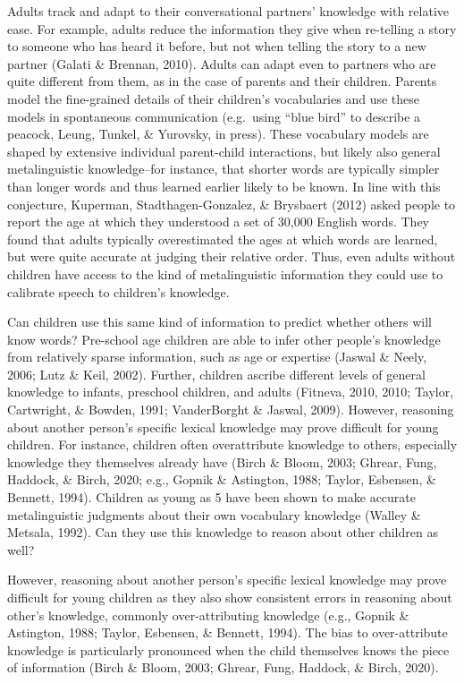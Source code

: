 \documentclass[10pt, letterpaper]{article}
\begin{document}
Adults track and adapt to their conversational partners' knowledge with
relative ease. For example, adults reduce the information they give when
re-telling a story to someone who has heard it before, but not when
telling the story to a new partner (Galati \& Brennan, 2010). Adults can
adapt even to partners who are quite different from them, as in the case
of parents and their children. Parents model the fine-grained details of
their children's vocabularies and use these models in spontaneous
communication (e.g.~using {``blue bird''} to describe a peacock, Leung,
Tunkel, \& Yurovsky, in press). These vocabulary models are shaped by
extensive individual parent-child interactions, but likely also general
metalinguistic knowledge--for instance, that shorter words are typically
simpler than longer words and thus learned earlier likely to be known.
In line with this conjecture, Kuperman, Stadthagen-Gonzalez, \&
Brysbaert (2012) asked people to report the age at which they understood
a set of 30,000 English words. They found that adults typically
overestimated the ages at which words are learned, but were quite
accurate at judging their relative order. Thus, even adults without
children have access to the kind of metalinguistic information they
could use to calibrate speech to children's knowledge.

Can children use this same kind of information to predict whether others
will know words? Pre-school age children are able to infer other
people's knowledge from relatively sparse information, such as age or
expertise (Jaswal \& Neely, 2006; Lutz \& Keil, 2002). Further, children
ascribe different levels of general knowledge to infants, preschool
children, and adults (Fitneva, 2010, 2010; Taylor, Cartwright, \&
Bowden, 1991; VanderBorght \& Jaswal, 2009). However, reasoning about
another person's specific lexical knowledge may prove difficult for
young children. For instance, children often overattribute knowledge to
others, especially knowledge they themselves already have (Birch \&
Bloom, 2003; Ghrear, Fung, Haddock, \& Birch, 2020; e.g., Gopnik \&
Astington, 1988; Taylor, Esbensen, \& Bennett, 1994). Children as young
as 5 have been shown to make accurate metalinguistic judgments about
their own vocabulary knowledge (Walley \& Metsala, 1992). Can they use
this knowledge to reason about other children as well?

However, reasoning about another person's specific lexical knowledge may
prove difficult for young children as they also show consistent errors
in reasoning about other's knowledge, commonly over-attributing
knowledge (e.g., Gopnik \& Astington, 1988; Taylor, Esbensen, \&
Bennett, 1994). The bias to over-attribute knowledge is particularly
pronounced when the child themselves knows the piece of information
(Birch \& Bloom, 2003; Ghrear, Fung, Haddock, \& Birch, 2020).
\end{document}
